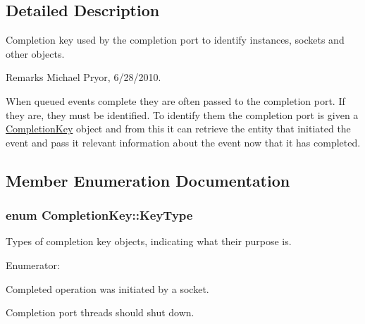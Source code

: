 \subsection{Detailed Description}
Completion key used by the completion port to identify instances, sockets and other objects. \begin{DoxyRemark}{Remarks}
Michael Pryor, 6/28/2010.
\end{DoxyRemark}
When queued events complete they are often passed to the completion port. If they are, they must be identified. To identify them the completion port is given a \hyperlink{class_completion_key}{CompletionKey} object and from this it can retrieve the entity that initiated the event and pass it relevant information about the event now that it has completed. 

\subsection{Member Enumeration Documentation}
\hypertarget{class_completion_key_ad0789e8ca951edd8ee5b1b2fb7cdd8b4}{
\subsubsection[{KeyType}]{\setlength{\rightskip}{0pt plus 5cm}enum {\bf CompletionKey::KeyType}}}
\label{class_completion_key_ad0789e8ca951edd8ee5b1b2fb7cdd8b4}


Types of completion key objects, indicating what their purpose is. 

\begin{Desc}
\item[Enumerator: ]\par
\begin{description}
\item[{\em 
\hypertarget{class_completion_key_ad0789e8ca951edd8ee5b1b2fb7cdd8b4a935186545139a1c56403400651f6a25c}{
SOCKET}
\label{class_completion_key_ad0789e8ca951edd8ee5b1b2fb7cdd8b4a935186545139a1c56403400651f6a25c}
}]Completed operation was initiated by a socket. \item[{\em 
\hypertarget{class_completion_key_ad0789e8ca951edd8ee5b1b2fb7cdd8b4ac1d7e0bee4bbd1cd27869c1ad970dad8}{
SHUTDOWN}
\label{class_completion_key_ad0789e8ca951edd8ee5b1b2fb7cdd8b4ac1d7e0bee4bbd1cd27869c1ad970dad8}
}]Completion port threads should shut down. \end{description}
\end{Desc}



